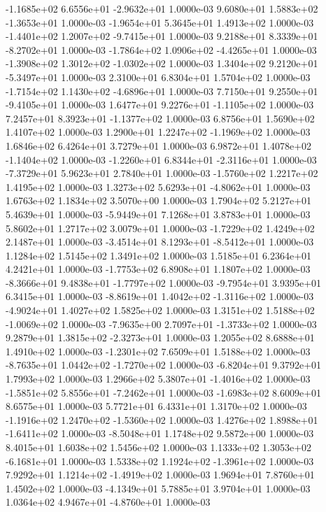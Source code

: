 -1.1685e+02  6.6556e+01 -2.9632e+01  1.0000e-03
 9.6080e+01  1.5883e+02 -1.3653e+01  1.0000e-03
-1.9654e+01  5.3645e+01  1.4913e+02  1.0000e-03
-1.4401e+02  1.2007e+02 -9.7415e+01  1.0000e-03
 9.2188e+01  8.3339e+01 -8.2702e+01  1.0000e-03
-1.7864e+02  1.0906e+02 -4.4265e+01  1.0000e-03
-1.3908e+02  1.3012e+02 -1.0302e+02  1.0000e-03
 1.3404e+02  9.2120e+01 -5.3497e+01  1.0000e-03
2.3100e+01 6.8304e+01 1.5704e+02  1.0000e-03
-1.7154e+02  1.1430e+02 -4.6896e+01  1.0000e-03
 7.7150e+01  9.2550e+01 -9.4105e+01  1.0000e-03
 1.6477e+01  9.2276e+01 -1.1105e+02  1.0000e-03
 7.2457e+01  8.3923e+01 -1.1377e+02  1.0000e-03
6.8756e+01 1.5690e+02 1.4107e+02  1.0000e-03
 1.2900e+01  1.2247e+02 -1.1969e+02  1.0000e-03
1.6846e+02 6.4264e+01 3.7279e+01  1.0000e-03
 6.9872e+01  1.4078e+02 -1.1404e+02  1.0000e-03
-1.2260e+01  6.8344e+01 -2.3116e+01  1.0000e-03
-7.3729e+01  5.9623e+01  2.7840e+01  1.0000e-03
-1.5760e+02  1.2217e+02  1.4195e+02  1.0000e-03
 1.3273e+02  5.6293e+01 -4.8062e+01  1.0000e-03
1.6763e+02 1.1834e+02 3.5070e+00  1.0000e-03
1.7904e+02 5.2127e+01 5.4639e+01  1.0000e-03
-5.9449e+01  7.1268e+01  3.8783e+01  1.0000e-03
5.8602e+01 1.2717e+02 3.0079e+01  1.0000e-03
-1.7229e+02  1.4249e+02  2.1487e+01  1.0000e-03
-3.4514e+01  8.1293e+01 -8.5412e+01  1.0000e-03
1.1284e+02 1.5145e+02 1.3491e+02  1.0000e-03
1.5185e+01 6.2364e+01 4.2421e+01  1.0000e-03
-1.7753e+02  6.8908e+01  1.1807e+02  1.0000e-03
-8.3666e+01  9.4838e+01 -1.7797e+02  1.0000e-03
-9.7954e+01  3.9395e+01  6.3415e+01  1.0000e-03
-8.8619e+01  1.4042e+02 -1.3116e+02  1.0000e-03
-4.9024e+01  1.4027e+02  1.5825e+02  1.0000e-03
 1.3151e+02  1.5188e+02 -1.0069e+02  1.0000e-03
-7.9635e+00  2.7097e+01 -1.3733e+02  1.0000e-03
 9.2879e+01  1.3815e+02 -2.3273e+01  1.0000e-03
1.2055e+02 8.6888e+01 1.4910e+02  1.0000e-03
-1.2301e+02  7.6509e+01  1.5188e+02  1.0000e-03
-8.7635e+01  1.0442e+02 -1.7270e+02  1.0000e-03
-6.8204e+01  9.3792e+01  1.7993e+02  1.0000e-03
 1.2966e+02  5.3807e+01 -1.4016e+02  1.0000e-03
-1.5851e+02  5.8556e+01 -7.2462e+01  1.0000e-03
-1.6983e+02  8.6009e+01  8.6575e+01  1.0000e-03
5.7721e+01 6.4331e+01 1.3170e+02  1.0000e-03
-1.1916e+02  1.2470e+02 -1.5360e+02  1.0000e-03
 1.4276e+02  1.8988e+01 -1.6411e+02  1.0000e-03
-8.5048e+01  1.1748e+02  9.5872e+00  1.0000e-03
8.4015e+01 1.6038e+02 1.5456e+02  1.0000e-03
 1.1333e+02  1.3053e+02 -6.1681e+01  1.0000e-03
 1.5338e+02  1.1924e+02 -1.3961e+02  1.0000e-03
 7.9292e+01  1.1214e+02 -1.4919e+02  1.0000e-03
1.9694e+01 7.8760e+01 1.4502e+02  1.0000e-03
-4.1349e+01  5.7885e+01  3.9704e+01  1.0000e-03
 1.0364e+02  4.9467e+01 -4.8760e+01  1.0000e-03
